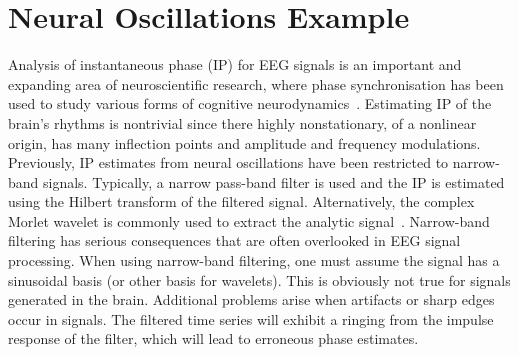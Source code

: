 \documentclass[a4paper]{IEEEtran}
\begin{document}
% 
\section{Neural Oscillations Example}\label{EEGExampleSection}
Analysis of instantaneous phase (IP) for EEG signals is an important and expanding area of neuroscientific research, where phase synchronisation has been used to study various forms of cognitive neurodynamics~\cite{Varela2001}. Estimating IP of the brain's rhythms is nontrivial since there highly nonstationary, of a nonlinear origin, has many inflection points and amplitude and frequency modulations. Previously, IP estimates from neural oscillations have been restricted to narrow-band signals. Typically, a narrow pass-band filter is used and the IP is estimated using the Hilbert transform of the filtered signal. Alternatively, the complex Morlet wavelet is commonly used to extract the analytic signal~\cite{LeVanQuyen2001}. Narrow-band filtering has serious consequences that are often overlooked in EEG signal processing. When using narrow-band filtering, one must assume the signal has a sinusoidal basis (or other basis for wavelets). This is obviously not true for signals generated in the brain. Additional problems arise when artifacts or sharp edges occur in signals. The filtered time series will exhibit a ringing from the impulse response of the filter, which will lead to erroneous phase estimates. 
\end{document}
